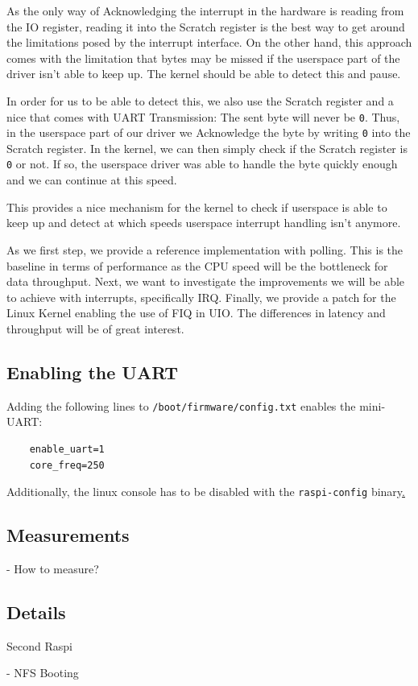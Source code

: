 \documentclass[../main.tex]{subfiles}
\begin{document}
    As the only way of Acknowledging the interrupt in the hardware is reading from the IO register, reading it into the Scratch register is the best way to get around the limitations posed by the interrupt interface. On the other hand, this approach comes with the limitation that bytes may be missed if the userspace part of the driver isn't able to keep up. The kernel should be able to detect this and pause.

    In order for us to be able to detect this, we also use the Scratch register and a nice \todo[Eigenheit] that comes with UART Transmission: The sent byte will never be \texttt{0}. Thus, in the userspace part of our driver we Acknowledge the byte by writing \texttt{0} into the Scratch register. In the kernel, we can then simply check if the Scratch register is \texttt{0} or not. If so, the userspace driver was able to handle the byte quickly enough and we can continue at this speed.

    This provides a nice mechanism for the kernel to check if userspace is able to keep up and detect at which speeds userspace interrupt handling isn't anymore.


    \clearpage

    As we first step, we provide a reference implementation with polling. This is the baseline in terms of performance as the CPU speed will be the bottleneck for data throughput. Next, we want to investigate the improvements we will be able to achieve with interrupts, specifically IRQ. Finally, we provide a patch for the Linux Kernel enabling the use of FIQ in UIO. The differences in latency and throughput will be of great interest.

    \subsection{Enabling the UART}

    Adding the following lines to \texttt{/boot/firmware/config.txt} enables the mini-UART:
\begin{verbatim}
    enable_uart=1
    core_freq=250
\end{verbatim}

    Additionally, the linux console has to be disabled with the \texttt{raspi-config} binary\href{https://www.raspberrypi.com/documentation/computers/configuration.html\#disabling-the-linux-serial-console}. 

    \subsection{Measurements}
    - How to measure?

    \subsection{Details}
    Second Raspi

    - NFS Booting
\end{document}
